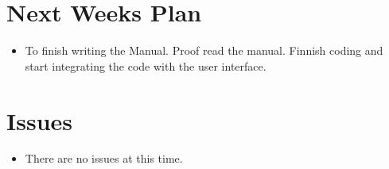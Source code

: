 \section{Next Weeks Plan}
\begin{itemize}
	\item To finish writing the Manual. Proof read the manual. Finnish
              coding and start integrating the code with the user interface.
\end{itemize}

%
%
%
\section{Issues}
\begin{itemize}
	\item There are no issues at this time.
\end{itemize}



